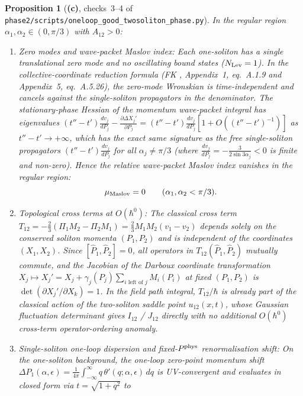 \documentclass[11pt,a4paper]{article}
\newcommand{\Lc}{\textsf{\textbf{(c)}}}
\newcommand{\script}[1]{\texttt{phase2/\allowbreak scripts/\allowbreak #1}}
\newtheorem{proposition}{Proposition}[section]
\theoremstyle{remark}
\begin{document}
\begin{proposition}[\Lc, checks~3--4 of \script{oneloop\_good\_twosoliton\_phase.py}]\label{prop:maslov_top_renorm}
In the regular region $\alpha_1,\alpha_2\in(0,\pi/3)$ with $A_{12}>0$:
\begin{enumerate}
\item \emph{Zero modes and wave-packet Maslov index:} Each one-soliton has a single translational zero mode and no oscillating bound states ($N_{\rm Lev}=1$). In the collective-coordinate reduction formula (FK \cite{FK78}, Appendix~1, eq.~A.1.9 and Appendix~5, eq.~A.5.26), the zero-mode Wronskian is time-independent and cancels against the single-soliton propagators in the denominator. The stationary-phase Hessian of the momentum wave-packet integral has eigenvalues $(t''-t')\frac{dv_j}{dP_j}-\frac{\partial\Delta X_j'}{\partial P_j}=(t''-t')\frac{dv_j}{dP_j}[1+O((t''-t')^{-1})]$ as $t''-t'\to+\infty$, which has the \emph{exact same signature} as the free single-soliton propagators $(t''-t')\frac{dv_j}{dP_j}$ for all $\alpha_j\neq\pi/3$ (where $\frac{dv_j}{dP_j}=-\frac{3}{2\sin 3\alpha_j}<0$ is finite and non-zero). Hence the relative wave-packet Maslov index vanishes in the regular region:
\begin{equation}\label{eq:maslov_zero}
\mu_{\rm Maslov}=0\qquad (\alpha_1,\alpha_2<\pi/3).
\end{equation}
\item \emph{Topological cross terms at $O(\hbar^0)$:} The classical cross term $T_{12}=-\tfrac23(\Pi_1 M_2-\Pi_2 M_1)=\tfrac23 M_1 M_2(v_1-v_2)$ depends solely on the conserved soliton momenta $(P_1,P_2)$ and is independent of the coordinates $(X_1,X_2)$. Since $[\hat{P}_1,\hat{P}_2]=0$, all operators in $T_{12}(\hat{P}_1,\hat{P}_2)$ mutually commute, and the Jacobian of the Darboux coordinate transformation $X_j\mapsto X_j'=X_j+\gamma_j(P_j)\sum_{i\text{ left of }j}M_i(P_i)$ at fixed $(P_1,P_2)$ is $\det(\partial X_j'/\partial X_k)=1$. In the field path integral, $T_{12}/\hbar$ is already part of the classical action of the two-soliton saddle point $u_{12}(x,t)$, whose Gaussian fluctuation determinant gives $I_{12}$ / $J_{12}$ directly with no additional $O(\hbar^0)$ cross-term operator-ordering anomaly.
\item \emph{Single-soliton one-loop dispersion and fixed-$P^{\rm phys}$ renormalisation shift:} On the one-soliton background, the one-loop zero-point momentum shift $\Delta P_1(\alpha,\epsilon)=\frac{1}{4\pi}\int_{-\infty}^\infty q\,\theta'(q;\alpha,\epsilon)\,dq$ is UV-convergent and evaluates in closed form via $t=\sqrt{1+q^2}$ to

\end{enumerate}
\end{proposition}
\end{document}
